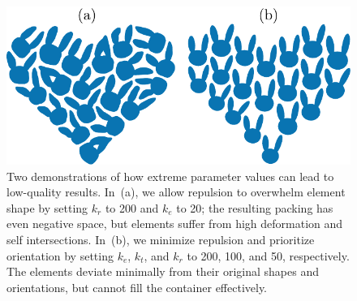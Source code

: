 \begin{figure}
\centering
\includegraphics[width=0.85\columnwidth]{figures/repulsionpak/bad_results.pdf} 
\vspace{-12pt}
\caption[Two demonstrations of how extreme parameter values can lead to \newline 
	low-quality results]
	{\label{bad_results}
Two demonstrations of how extreme parameter values can lead to
	low-quality results.  In~(a), we allow repulsion to overwhelm element
	shape by setting $k_r$ to 200 and $k_e$ to 20; the resulting packing 
	has even negative space, but elements suffer from high deformation
	and self intersections.  In~(b), we minimize repulsion and prioritize
	orientation by setting $k_e$, $k_t$, and $k_r$ to 200, 100, and 50,
	respectively.  The elements deviate minimally from their original shapes 
	and orientations, but cannot fill the container effectively.
}
\end{figure}

